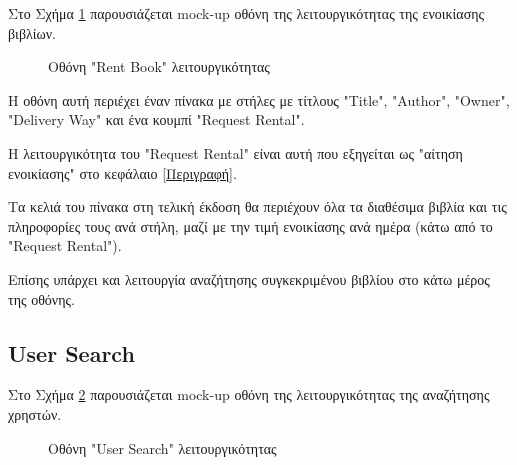 \documentclass[12pt,a4paper]{article}
\begin{document}
Στο Σχήμα \ref{Οθόνη "Rent Book" λειτουργικότητας} παρουσιάζεται mock-up οθόνη της λειτουργικότητας της ενοικίασης βιβλίων.

\begin{figure}[H]
	\caption{Οθόνη "Rent Book" λειτουργικότητας}
	\label{Οθόνη "Rent Book" λειτουργικότητας}
\end{figure}

Η οθόνη αυτή περιέχει έναν πίνακα με στήλες με τίτλους "Title", "Author", "Owner", "Delivery Way" και ένα κουμπί "Request Rental". 

Η λειτουργικότητα του "Request Rental" είναι αυτή που εξηγείται ως "αίτηση ενοικίασης" στο κεφάλαιο \ref{Περιγραφή}.

Τα κελιά του πίνακα στη τελική έκδοση θα περιέχουν όλα τα διαθέσιμα βιβλία και τις πληροφορίες τους ανά στήλη, μαζί με την τιμή ενοικίασης ανά ημέρα (κάτω από το "Request Rental").

Επίσης υπάρχει και λειτουργία αναζήτησης συγκεκριμένου βιβλίου στο κάτω μέρος της οθόνης.

\subsection{User Search}

Στο Σχήμα \ref{Οθόνη "User Search" λειτουργικότητας} παρουσιάζεται mock-up οθόνη της λειτουργικότητας της αναζήτησης χρηστών.

\begin{figure}[H]
	\caption{Οθόνη "User Search" λειτουργικότητας}
	\label{Οθόνη "User Search" λειτουργικότητας}
\end{figure}
\end{document}
